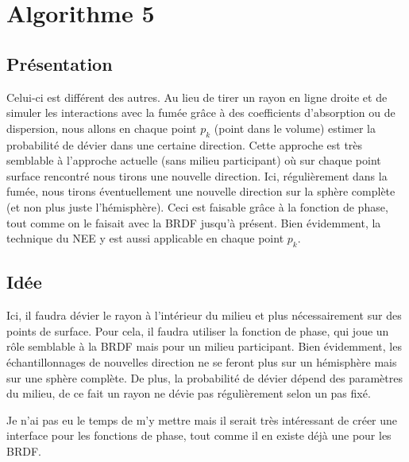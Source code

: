 \chapter{Algorithme 5}

\section{Présentation}

Celui-ci est différent des autres. Au lieu de tirer un rayon en ligne droite et de simuler les interactions avec la fumée grâce à des coefficients d'absorption ou de dispersion, nous allons en chaque point $p_k$ (point dans le volume) estimer la probabilité de dévier dans une certaine direction. Cette approche est très semblable à l'approche actuelle (sans milieu participant) où sur chaque point surface rencontré nous tirons une nouvelle direction. Ici, régulièrement dans la fumée, nous tirons éventuellement une nouvelle direction sur la sphère complète (et non plus juste l'hémisphère). Ceci est faisable grâce à la fonction de phase, tout comme on le faisait avec la BRDF jusqu'à présent. Bien évidemment, la technique du NEE y est aussi applicable en chaque point $p_k$.

\section{Idée}

Ici, il faudra dévier le rayon à l'intérieur du milieu et plus nécessairement sur des points de surface. Pour cela, il faudra utiliser la fonction de phase, qui joue un rôle semblable à la BRDF mais pour un milieu participant. Bien évidemment, les échantillonnages de nouvelles direction ne se feront plus sur un hémisphère mais sur une sphère complète. De plus, la probabilité de dévier dépend des paramètres du milieu, de ce fait un rayon ne dévie pas régulièrement selon un pas fixé.\par
Je n'ai pas eu le temps de m'y mettre mais il serait très intéressant de créer une interface pour les fonctions de phase, tout comme il en existe déjà une pour les BRDF.